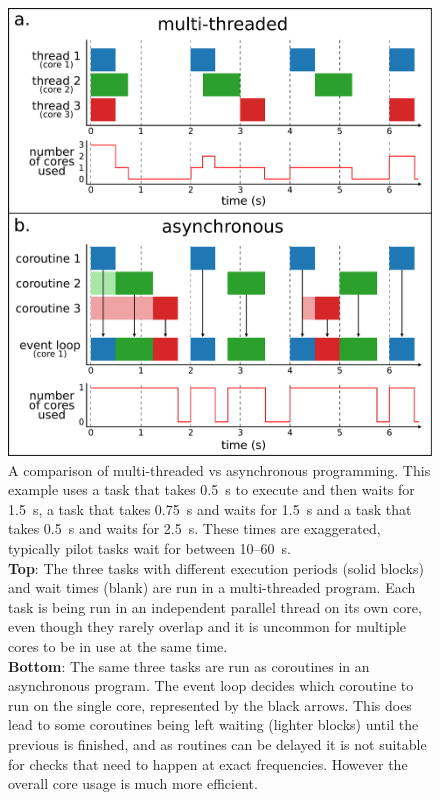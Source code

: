 \begin{colsection}
\begin{colsection}
\begin{figure}[p]
    \begin{center}
        \includegraphics[width=0.89\linewidth]{images/async.pdf}
    \end{center}
    \caption[Multi-threaded vs asynchronous programming]{
        A comparison of multi-threaded vs asynchronous programming. This example uses a  task that takes \SI{0.5}{\second} to execute and then waits for \SI{1.5}{\second}, a  task that takes \SI{0.75}{\second} and waits for \SI{1.5}{\second} and a  task that takes \SI{0.5}{\second} and waits for \SI{2.5}{\second}. These times are exaggerated, typically pilot tasks wait for between 10--\SI{60}{\second}. \\
        \textbf{Top}: The three tasks with different execution periods (solid blocks) and wait times (blank) are run in a multi-threaded program. Each task is being run in an independent parallel thread on its own core, even though they rarely overlap and it is uncommon for multiple cores to be in use at the same time. \\
        \textbf{Bottom}: The same three tasks are run as coroutines in an asynchronous program. The event loop decides which coroutine to run on the single core, represented by the black arrows. This does lead to some coroutines being left waiting (lighter blocks) until the previous is finished, and as routines can be delayed it is not suitable for checks that need to happen at exact frequencies. However the overall core usage is much more efficient.
    }\label{fig:async}
\end{figure}


\end{colsection}
\end{colsection}
